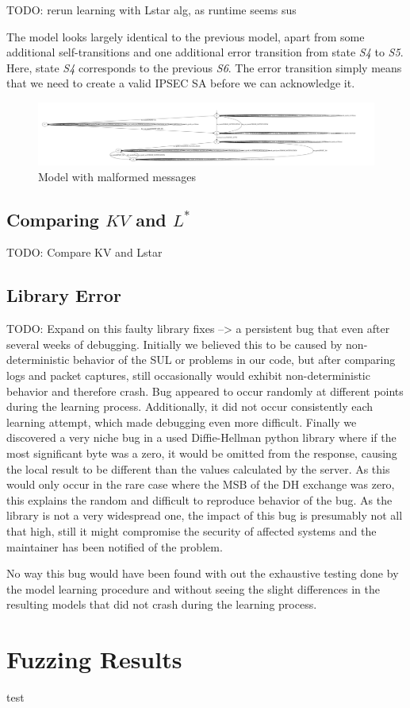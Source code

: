 TODO: rerun learning with Lstar alg, as runtime seems sus

The model looks largely identical to the previous model, apart from some additional self-transitions and one additional error transition from state \emph{S4} to \emph{S5}. Here, state \emph{S4} corresponds to the previous \emph{S6}. The error transition simply means that we need to create a valid IPSEC SA before we can acknowledge it.

\begin{figure}
	\centering
	\includegraphics[width=\linewidth]{images/WithFilterWithErrors}
	\caption{Model with malformed messages}
	\label{fig:withfilterwitherrors}
\end{figure}

\subsection{Comparing $KV$ and $L^*$} \label{subsec:comp_kv_lstar}
TODO: Compare KV and Lstar


\subsection{Library Error} \label{subsec:liberror}
TODO: Expand on this
faulty library fixes --> a persistent bug that even after several weeks of debugging. Initially we believed this to be caused by non-deterministic behavior of the SUL or problems in our code, but after comparing logs and packet captures, still occasionally would exhibit non-deterministic behavior and therefore crash. Bug appeared to occur randomly at different points during the learning process. Additionally, it did not occur consistently each learning attempt, which made debugging even more difficult. Finally we discovered a very niche bug in a used Diffie-Hellman python library where if the most significant byte was a zero, it would be omitted from the response, causing the local result to be different than the values calculated by the server. As this would only occur in the rare case where the MSB of the DH exchange was zero, this explains the random and difficult to reproduce behavior of the bug. As the library is not a very widespread one, the impact of this bug is presumably not all that high, still it might compromise the security of affected systems and the maintainer has been notified of the problem.

No way this bug would have been found with out the exhaustive testing done by the model learning procedure and without seeing the slight differences in the resulting models that did not crash during the learning process.
\section{Fuzzing Results} \label{subsec:fuzzresults}
test
